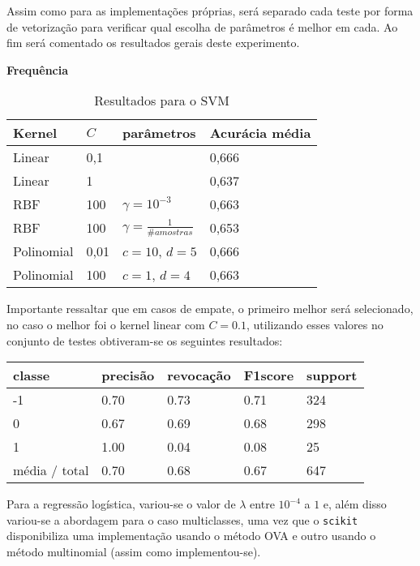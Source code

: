 Assim como para as implementações próprias, será separado cada teste por forma de vetorização para
verificar qual escolha de parâmetros é melhor em cada. Ao fim será comentado os resultados gerais
deste experimento.

\textbf{Frequência}

\begin{table}[H]
	\centering
	\caption{Resultados para o SVM}
	\begin{tabular}{l l l l}
		\hline
		Kernel & $C$ & parâmetros & Acurácia média \\
		\hline
		Linear & 0,1 & & 0,666 \\
		\hline
		Linear & 1 & & 0,637 \\
		\hline
		RBF & 100 & $\gamma = 10^{-3}$ & 0,663 \\
		\hline
		RBF & 100 & $\gamma = \frac{1}{\# amostras}$ & 0,653 \\
		\hline
		Polinomial & 0,01 & $c = 10$, $d = 5$ & 0,666 \\
		\hline
		Polinomial & 100 & $c = 1$, $d = 4$ & 0,663 \\
		\hline
	\end{tabular}
\end{table}

Importante ressaltar que em casos de empate, o primeiro melhor será selecionado, no caso o melhor
foi o kernel linear com $C = 0.1$, utilizando esses valores no conjunto de testes obtiveram-se os 
seguintes resultados:

\begin{table}[H]
	\centering
		\begin{tabular}{l | l | l | l | l}
		\hline
		classe  	&	precisão  &  revocação &  F1\-score &  support \\
		\hline		
		 -1     &  0.70  &    0.73   &   0.71   &    324 \\
		  \hline
          0     &  0.67   &   0.69   &   0.68    &   298 \\
          \hline
          1     &  1.00   &   0.04   &   0.08    &    25 \\
			\hline
		média / total     &  0.70  &    0.68  &    0.67   &    647 \\
		\hline
	\end{tabular}
\end{table}

Para a regressão logística, variou-se o valor de $\lambda$ entre $10^{-4}$ a $1$ e, além disso
variou-se a abordagem para o caso multiclasses, uma vez que o \texttt{scikit} disponibiliza
uma implementação usando o método OVA e outro usando o método multinomial (assim como implementou-se).

